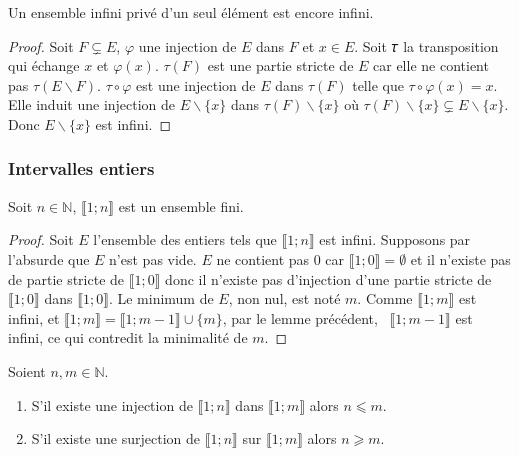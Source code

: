 \begin{theorem}
Un ensemble infini privé d'un seul élément est encore infini.
\end{theorem}
\begin{proof}
Soit \(𝐹⊊𝐸\), \(𝜑\) une injection de \(𝐸\) dans \(𝐹\) et \(𝑥∈𝐸\). Soit 𝜏 la transposition qui échange \(𝑥\) et
\(𝜑(𝑥)\). \(𝜏(𝐹)\) est une partie stricte de \(𝐸\) car elle ne contient pas \(𝜏(𝐸∖𝐹)\). \(𝜏∘𝜑\) est une
injection de \(𝐸\) dans \(𝜏(𝐹)\) telle que \(𝜏∘𝜑(𝑥)=𝑥\). Elle induit une injection de \(𝐸∖\{𝑥\}\) dans
\(𝜏(𝐹)∖\{𝑥\}\) où \(𝜏(𝐹)∖\{𝑥\}⊊𝐸∖\{𝑥\}\). Donc \(𝐸∖\{𝑥\}\) est infini.
\end{proof}
\subsubsection[Intervalles entiers]{Intervalles entiers}
\begin{theorem}
Soit \(𝑛∈ℕ\), \(⟦1;𝑛⟧\) est un ensemble fini.
\end{theorem}
\begin{proof}
Soit \(𝐸\) l'ensemble des entiers tels que \(⟦1;𝑛⟧\) est infini.
Supposons par l'absurde que \(𝐸\) n'est pas vide. \(𝐸\) ne contient pas \(0\) car
\(⟦1;0⟧=\mathsf{ ∅}\) et il n'existe pas de partie stricte de \(⟦1;0⟧\) donc il n'existe pas d'injection d'une
partie stricte de \(⟦1;0⟧\) dans \(⟦1;0⟧\). Le minimum de \(𝐸\), non nul, est noté \(𝑚\). Comme \(⟦1;𝑚⟧\) est
infini, et \(⟦1;𝑚⟧=⟦1;𝑚-1⟧∪\{𝑚\}\), par le lemme précédent, \ \(⟦1;𝑚-1⟧\) est infini, ce qui contredit la
minimalité de \(𝑚\).
\end{proof}
\begin{theorem}
Soient \(𝑛,𝑚∈ℕ\).
\begin{enumerate}
\item S'il existe une injection de \(⟦1;𝑛⟧\) dans \(⟦1;𝑚⟧\) alors \(𝑛⩽𝑚\).
\item S'il existe une surjection de \(⟦1;𝑛⟧\) sur \(⟦1;𝑚⟧\) alors \(𝑛⩾𝑚\).
\end{enumerate}
\end{theorem}
